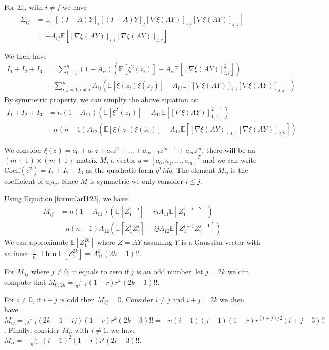 \documentclass{article}
\def\E{\mathbb{E}}
\begin{document}
For $\Sigma_{ij}$ with $i\neq j$ we have
\begin{align*}
\Sigma_{ij} &=  \E[ [(I-A)Y]_i [(I-A)Y]_j [\nabla \xi(AY)]_{i,i} [\nabla \xi(AY)]_{j,j}]  \\
&= -A_{ij} \E[[\nabla \xi(AY)]_{i,i} [\nabla \xi(AY)]_{j,j}]
\end{align*}

We then have
\begin{align*}
I_1+I_2+I_3 &= \sum_{i=1}^n (1-A_{ii})(\E[\xi^2(z_i)] - A_{ii} \E[ [\nabla \xi(AY)]_{i,i}^2]) \\
&- \sum_{i,j=1, i \neq j}^n A_{ij} (\E[\xi(z_i)\xi(z_j)] - A_{ij}\E[[\nabla \xi(AY)]_{i,i} [\nabla \xi(AY)]_{j,j}])
\end{align*}
By symmetric property, we can simplfy the above equation as:
\begin{align}\label{formularI123}
I_1+I_2+I_3 &=n(1-A_{11})(\E[\xi^2(z_1)] - A_{11} \E[ [\nabla \xi(AY)]_{1,1}^2]) \\
&- n(n-1)A_{12}(\E[\xi(z_1)\xi(z_2)] - A_{12}\E[[\nabla \xi(AY)]_{1,1} [\nabla \xi(AY)]_{2,2}])\nonumber
\end{align}

We consider $\xi(z) = a_0 + a_1 z + a_2 z^2 + \dots + a_{m-1} z^{m-1} + a_m z^m $, there will be an $(m+1) \times (m+1) $ matrix $M$, a vector  $q = [a_0, a_1, \dots, a_m]^T$ and  we can write $\textrm{Coeff}(\epsilon^2) = I_1 + I_2 + I_3$ as the quadratic form $ q^T M q $. The element $M_{ij}$ is the coefficient of $a_ia_j$. Since $M$ is symmetric we only consider $i\leq j$.

Using Equation \ref{formularI123}, we have 
\begin{align*}
M_{ij} &= n(1-A_{11}) (\E[Z_1^{i+j}] - ijA_{11} \E[Z_1^{i+j-2}])  \\
&-n(n-1)A_{12}(\E[Z_1^i Z_2^j] - ijA_{12}\E[Z_1^{i-1}Z_2^{j-1}])
\end{align*}
We can approximate $\E[Z_1^{2k}]$ where $Z=AY$ assuming $Y$ is a Gaussian vector with variance $\frac{1}{n}$. Then $\E[Z_1^{2k}] = A_{11}^k (2k-1)!!$.

For $M_{0j}$ where $j \neq 0$, it equals to zero if $j$ is an odd number, let $j=2k$ we can compute that $M_{0,2k}=\frac{1}{n^{k-1}} (1-r)r^k (2k-1)!! $. 

For $i \neq 0$, if $i+j$ is odd then $M_{ij} = 0$. Consider $i \neq j$ and $i+j = 2k$ we then have $M_{ij} = \frac{1}{n^{k-1}} (2k-1-ij) (1-r)r^k (2k-3)!! = -n(i-1)(j-1) (1-r)r^{(i+j)/ 2 } (i+j-3)!!$. Finally, consider $M_{ii}$ with $i \neq 1$. we have $M_{ii} = 
-\frac{1}{n^{i-1}} (i-1)^2 (1-r)r^i (2i-3)!!$.
\end{document}
